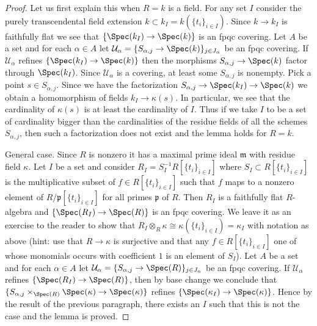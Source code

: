 \begin{proof}
Let us first explain this when $R = k$ is a field. For any set $I$ consider
the purely transcendental field extension
$k \subset k_I = k(\{t_i\}_{i \in I})$. Since $k \to k_I$ is faithfully flat
we see that $\{\Spec(k_I) \to \Spec(k)\}$ is an fpqc covering.
Let $A$ be a set and for each $\alpha \in A$ let
$\mathcal{U}_\alpha = \{S_{\alpha, j} \to \Spec(k)\}_{j \in J_\alpha}$ be an
fpqc covering. If $\mathcal{U}_\alpha$ refines $\{\Spec(k_I) \to \Spec(k)\}$
then the morphisms $S_{\alpha, j} \to \Spec(k)$ factor through
$\Spec(k_I)$. Since $\mathcal{U}_\alpha$ is a covering,
at least some $S_{\alpha, j}$ is nonempty. Pick a
point $s \in S_{\alpha, j}$. Since we have the factorization
$S_{\alpha, j} \to \Spec(k_I) \to \Spec(k)$
we obtain a homomorphism of fields $k_I \to \kappa(s)$.
In particular, we see that the cardinality of $\kappa(s)$
is at least the cardinality of $I$. Thus if we take $I$ to be a set
of cardinality bigger than the cardinalities of the residue fields
of all the schemes $S_{\alpha, j}$, then such a factorization does
not exist and the lemma holds for $R = k$.

\medskip\noindent
General case. Since $R$ is nonzero it has a maximal prime ideal
$\mathfrak m$ with residue field $\kappa$. Let $I$ be a set and
consider $R_I = S_I^{-1} R[\{t_i\}_{i \in I}]$
where $S_I \subset R[\{t_i\}_{i \in I}]$ is the multiplicative
subset of $f \in R[\{t_i\}_{i \in I}]$ such that $f$ maps to
a nonzero element of $R/\mathfrak p[\{t_i\}_{i \in I}]$ for
all primes $\mathfrak p$ of $R$. Then $R_I$ is a faithfully
flat $R$-algebra and $\{\Spec(R_I) \to \Spec(R)\}$ is an
fpqc covering. We leave it as an exercise to the reader to show that
$R_I \otimes_R \kappa \cong \kappa(\{t_i\}_{i \in I}) = \kappa_I$
with notation as above (hint: use that $R \to \kappa$ is surjective
and that any $f \in R[\{t_i\}_{i \in I}]$ one of whose monomials occurs
with coefficient $1$ is an element of $S_I$). Let $A$ be a set and
for each $\alpha \in A$ let
$\mathcal{U}_\alpha = \{S_{\alpha, j} \to \Spec(R)\}_{j \in J_\alpha}$ be an
fpqc covering. If $\mathcal{U}_\alpha$ refines $\{\Spec(R_I) \to \Spec(R)\}$,
then by base change we conclude that
$\{S_{\alpha, j} \times_{\Spec(R)} \Spec(\kappa) \to \Spec(\kappa)\}$
refines $\{\Spec(\kappa_I) \to \Spec(\kappa)\}$.
Hence by the result of the previous paragraph, there exists an $I$
such that this is not the case and the lemma is proved.
\end{proof}












